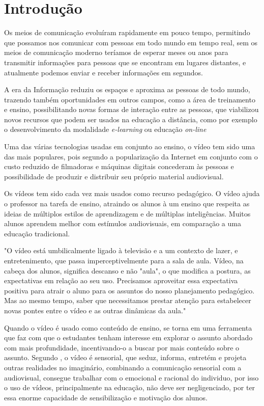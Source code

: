 \chapter{Introdução}
Os meios de comunicação evoluíram rapidamente em pouco tempo, permitindo que possamos nos comunicar com pessoas em todo mundo em tempo real, sem os meios de comunicação moderno teríamos de esperar meses ou anos para transmitir informações para pessoas que se encontram em lugares distantes, e atualmente podemos enviar e receber informações em segundos.
\par
A era da Informação reduziu os espaços e aproxima as pessoas de todo mundo, trazendo também oportunidades em outros campos, como a área de treinamento e ensino, possibilitando novas formas de interação entre as pessoas, que viabilizou novos recursos que podem ser usados na educação a distância, como por exemplo o desenvolvimento da modalidade \textit{e-learning} ou educação \textit{on-line}
\par
Uma das várias tecnologias usadas em conjunto ao ensino, o vídeo tem sido uma das mais populares, pois segundo  a popularização da Internet em conjunto com o custo reduzido de filmadoras e máquinas digitais concederam às pessoas e possibilidade de produzir e distribuir seu próprio material audiovisual.
\par
Os vídeos tem sido cada vez mais usados como recurso pedagógico. O vídeo ajuda o professor na tarefa de ensino, atraindo os alunos à um ensino que respeita as ideias de múltiplos estilos de aprendizagem e de múltiplas inteligências. Muitos alunos aprendem melhor com estímulos audiovisuais, em comparação a uma educação tradicional.
\par
\begin{citacao}
  \label{cit: moran}
  "O vídeo está umbilicalmente ligado à televisão e a um contexto de lazer, e entretenimento, que passa imperceptivelmente para a sala de aula. Vídeo, na cabeça dos alunos, significa descanso e não "aula", o que modifica a postura, as expectativas em relação ao seu uso. Precisamos aproveitar essa expectativa positiva para atrair o aluno para os assuntos do nosso planejamento pedagógico. Mas ao mesmo tempo, saber que necessitamos prestar atenção para estabelecer novas pontes entre o vídeo e as outras dinâmicas da aula." \cite{moran}
\end{citacao}
\par
Quando o vídeo é usado como conteúdo de ensino, se torna em uma ferramenta que faz com que o estudantes tenham interesse em explorar o assunto abordado com mais profundidade, incentivando-o a buscar por mais conteúdo sobre o assunto. Segundo \cite{moran}, o vídeo é sensorial, que seduz, informa, entretém e projeta outras realidades no imaginário, combinando a comunicação sensorial com a audiovisual, consegue trabalhar com o emocional e racional do individuo, por isso o uso de vídeos, principalmente na educação, não deve ser negligenciado, por ter essa enorme capacidade de sensibilização e motivação dos alunos.
